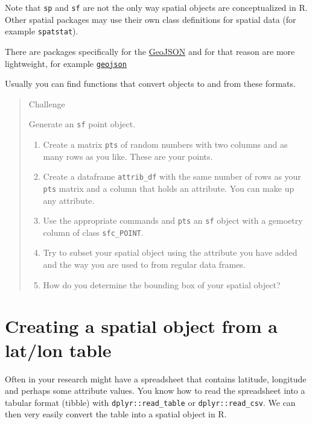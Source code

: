 \documentclass[
]{book}
\providecommand{\tightlist}{%
  \setlength{\itemsep}{0pt}\setlength{\parskip}{0pt}}
\begin{document}
Note that \texttt{sp} and \texttt{sf} are not the only way spatial objects are conceptualized in R. Other spatial packages may use their own class definitions for spatial data (for example \texttt{spatstat}).

There are packages specifically for the \href{https://tools.ietf.org/html/rfc7946}{GeoJSON} and for that reason are more lightweight, for example \href{https://cran.r-project.org/package=geojson}{\texttt{geojson}}

Usually you can find functions that convert objects to and from these formats.

\begin{quote}
Challenge

Generate an \texttt{sf} point object.

\begin{enumerate}
\def\labelenumi{\arabic{enumi}.}
\tightlist
\item
  Create a matrix \texttt{pts} of random numbers with two columns and as many rows as you like. These are your points.
\item
  Create a dataframe \texttt{attrib\_df} with the same number of rows as your \texttt{pts} matrix and a column that holds an attribute. You can make up any attribute.
\item
  Use the appropriate commands and \texttt{pts} an \texttt{sf} object with a gemoetry column of class \texttt{sfc\_POINT}.
\item
  Try to subset your spatial object using the attribute you have added and the way you are used to from regular data frames.
\item
  How do you determine the bounding box of your spatial object?
\end{enumerate}
\end{quote}

\hypertarget{creating-a-spatial-object-from-a-latlon-table}{%
\section{Creating a spatial object from a lat/lon table}\label{creating-a-spatial-object-from-a-latlon-table}}

Often in your research might have a spreadsheet that contains latitude, longitude and perhaps some attribute values. You know how to read the spreadsheet into a tabular format (tibble) with \texttt{dplyr::read\_table} or \texttt{dplyr::read\_csv}. We can then very easily convert the table into a spatial object in R.
\end{document}
